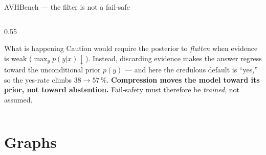 \documentclass[10pt,aspectratio=169]{beamer}
\begin{document}
\begin{frame}{AVHBench --- the filter is not a fail-safe}
\begin{columns}[T]
\begin{column}{0.55\textwidth}
\vspace{8pt}
\begin{alertblock}{What is happening}
{\footnotesize
Caution would require the posterior to \emph{flatten}
when evidence is weak ($\max_y p(y|x)\!\downarrow$). Instead, discarding evidence
makes the answer regress toward the unconditional prior
$p(y)$ --- and here the credulous default is ``yes,'' so the yes-rate climbs
$38\!\to\!57$\,\%. \textbf{Compression moves the model toward its prior, not
toward abstention.} Fail-safety must therefore be \emph{trained}, not assumed.}
\end{alertblock}
\end{column}
\end{columns}

\end{frame}


\section{Graphs}
\end{document}
